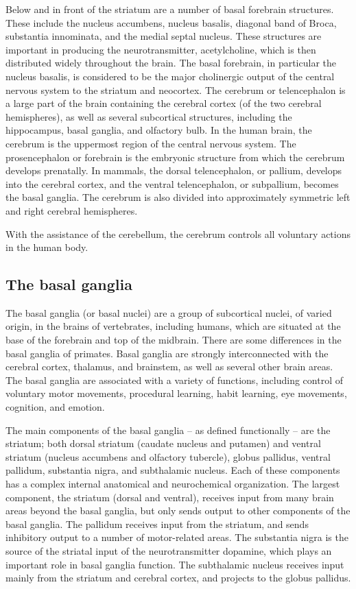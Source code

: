 Below and in front of the striatum are a number of basal forebrain structures. These include the nucleus accumbens, nucleus basalis, diagonal band of Broca, substantia innominata, and the medial septal nucleus. These structures are important in producing the neurotransmitter, acetylcholine, which is then distributed widely throughout the brain. The basal forebrain, in particular the nucleus basalis, is considered to be the major cholinergic output of the central nervous system to the striatum and neocortex.
The cerebrum or telencephalon is a large part of the brain containing the cerebral cortex (of the two cerebral hemispheres), as well as several subcortical structures, including the hippocampus, basal ganglia, and olfactory bulb. In the human brain, the cerebrum is the uppermost region of the central nervous system. The prosencephalon or forebrain is the embryonic structure from which the cerebrum develops prenatally. In mammals, the dorsal telencephalon, or pallium, develops into the cerebral cortex, and the ventral telencephalon, or subpallium, becomes the basal ganglia. The cerebrum is also divided into approximately symmetric left and right cerebral hemispheres.

With the assistance of the cerebellum, the cerebrum controls all voluntary actions in the human body.

\hypertarget{the-basal-ganglia}{%
\subsection{The basal ganglia}\label{the-basal-ganglia}}

The basal ganglia (or basal nuclei) are a group of subcortical nuclei, of varied origin, in the brains of vertebrates, including humans, which are situated at the base of the forebrain and top of the midbrain. There are some differences in the basal ganglia of primates. Basal ganglia are strongly interconnected with the cerebral cortex, thalamus, and brainstem, as well as several other brain areas. The basal ganglia are associated with a variety of functions, including control of voluntary motor movements, procedural learning, habit learning, eye movements, cognition, and emotion.

The main components of the basal ganglia -- as defined functionally -- are the striatum; both dorsal striatum (caudate nucleus and putamen) and ventral striatum (nucleus accumbens and olfactory tubercle), globus pallidus, ventral pallidum, substantia nigra, and subthalamic nucleus. Each of these components has a complex internal anatomical and neurochemical organization. The largest component, the striatum (dorsal and ventral), receives input from many brain areas beyond the basal ganglia, but only sends output to other components of the basal ganglia. The pallidum receives input from the striatum, and sends inhibitory output to a number of motor-related areas. The substantia nigra is the source of the striatal input of the neurotransmitter dopamine, which plays an important role in basal ganglia function. The subthalamic nucleus receives input mainly from the striatum and cerebral cortex, and projects to the globus pallidus.


